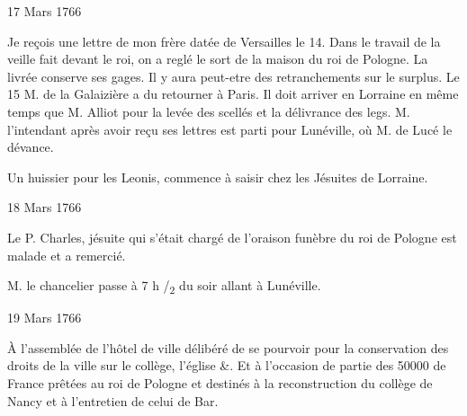                      \begin{diary}{17 Mars 1766}{}
                        
                         Je reçois une lettre de mon frère
                           datée
                           de Versailles
                           le 14. Dans le travail de la
                           veille fait devant le roi,
                           on a reglé le sort
                           de la maison du roi de Pologne. La livrée conserve ses
                           gages. Il y aura peut-etre des retranchements
                           sur le surplus. Le 15
                           M. de la Galaizière a du
                           retourner à Paris. Il doit
                           arriver en
                           Lorraine en même temps que M. Alliot pour
                           la levée des scellés et la délivrance des legs.
                           M. l'intendant après avoir
                           reçu ses lettres
                           est parti pour Lunéville,
                           où M. de Lucé
                           le dévance. \bigskip
        
        
                         Un huissier pour les Leonis, commence
                           à saisir chez
                           les Jésuites de Lorraine. \bigskip
        
        
                     \end{diary}

                     \begin{diary}{18 Mars 1766}{}
                        
                        
                           Le P. Charles, jésuite qui s'était chargé de
                           l'oraison funèbre du roi de Pologne est malade et
                           a remercié. \bigskip
        
        
                        
                           M. le chancelier passe à 7 h /\textsubscript{2} du soir
                           allant à Lunéville. \bigskip
        
        
                     \end{diary}

                     \begin{diary}{19 Mars 1766}{}
                        
                         À l'assemblée de l'hôtel de ville délibéré
                           de se pourvoir pour la conservation des
                           droits de la ville sur le collège, l’église &.
                           Et à l'occasion de partie des 50000 de
                              France
                           prêtées au roi de Pologne et destinés
                           à la reconstruction du collège de Nancy
                           et à l'entretien de celui de
                              Bar. \bigskip
        
        
                     \end{diary}
                     
